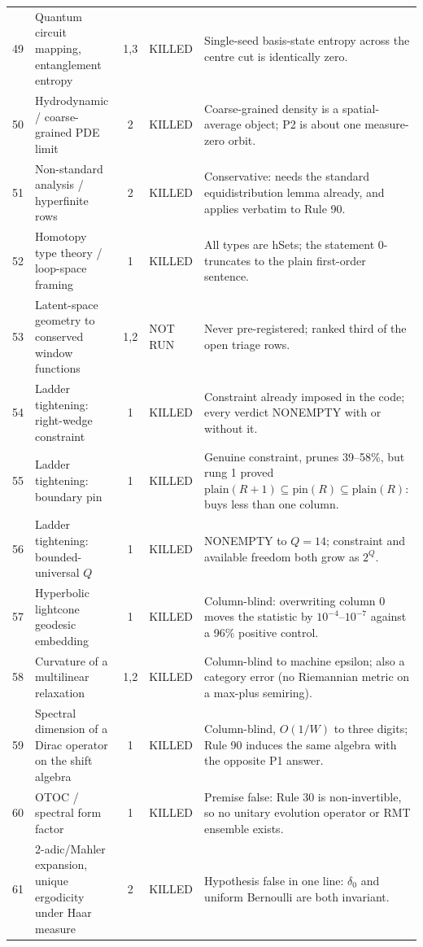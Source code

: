 \documentclass[11pt]{article}
\theoremstyle{definition}
\begin{document}
{\begin{longtable}{@{}r p{4.0cm} c p{1.7cm} p{6.1cm}@{}}
49 & Quantum circuit mapping, entanglement entropy & 1,3 & KILLED & Single-seed basis-state entropy across the centre cut is identically zero. \\
50 & Hydrodynamic / coarse-grained PDE limit & 2 & KILLED & Coarse-grained density is a spatial-average object; P2 is about one measure-zero orbit. \\
51 & Non-standard analysis / hyperfinite rows & 2 & KILLED & Conservative: needs the standard equidistribution lemma already, and applies verbatim to Rule 90. \\
52 & Homotopy type theory / loop-space framing & 1 & KILLED & All types are hSets; the statement 0-truncates to the plain first-order sentence. \\
53 & Latent-space geometry to conserved window functions & 1,2 & NOT RUN & Never pre-registered; ranked third of the open triage rows. \\
54 & Ladder tightening: right-wedge constraint & 1 & KILLED & Constraint already imposed in the code; every verdict NONEMPTY with or without it. \\
55 & Ladder tightening: boundary pin & 1 & KILLED & Genuine constraint, prunes 39--58\%, but rung 1 proved $\mathrm{plain}(R{+}1)\subseteq\mathrm{pin}(R)\subseteq\mathrm{plain}(R)$: buys less than one column. \\
56 & Ladder tightening: bounded-universal $Q$ & 1 & KILLED & NONEMPTY to $Q=14$; constraint and available freedom both grow as $2^Q$. \\
57 & Hyperbolic lightcone geodesic embedding & 1 & KILLED & Column-blind: overwriting column 0 moves the statistic by $10^{-4}$--$10^{-7}$ against a 96\% positive control. \\
58 & Curvature of a multilinear relaxation & 1,2 & KILLED & Column-blind to machine epsilon; also a category error (no Riemannian metric on a max-plus semiring). \\
59 & Spectral dimension of a Dirac operator on the shift algebra & 1 & KILLED & Column-blind, $O(1/W)$ to three digits; Rule 90 induces the same algebra with the opposite P1 answer. \\
60 & OTOC / spectral form factor & 1 & KILLED & Premise false: Rule 30 is non-invertible, so no unitary evolution operator or RMT ensemble exists. \\
61 & 2-adic/Mahler expansion, unique ergodicity under Haar measure & 2 & KILLED & Hypothesis false in one line: $\delta_0$ and uniform Bernoulli are both invariant. \\

\end{longtable}}
\end{document}
